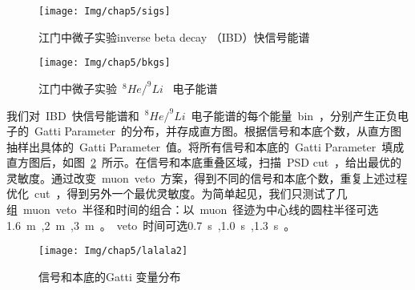 \begin{figure}[!htb]
\begin{minipage}[t]{0.48\linewidth}
    \centering
    \texttt{[image: Img/chap5/sigs]}
    \caption{江门中微子实验inverse beta decay （IBD）快信号能谱}
    \label{fig:p513}
\end{minipage}
\quad\quad
\begin{minipage}[t]{0.48\linewidth}
    \centering
    \texttt{[image: Img/chap5/bkgs]}
    \caption{江门中微子实验~$^{8}He/^{9}Li$~ 电子能谱}
    \label{fig:p514}
\end{minipage}
\end{figure}

我们对~IBD~快信号能谱和~$^{8}He/^{9}Li$~电子能谱的每个能量~bin~，分别产生正负电子的~Gatti Parameter~的分布，并存成直方图。根据信号和本底个数，从直方图抽样出具体的~Gatti Parameter~值。将所有信号和本底的~Gatti Parameter~填成直方图后，如图~\ref{fig:p519}~所示。在信号和本底重叠区域，扫描~PSD cut~，给出最优的灵敏度。通过改变~muon~veto~方案，得到不同的信号和本底个数，重复上述过程优化~cut~，得到另外一个最优灵敏度。为简单起见，我们只测试了几组~muon~veto~半径和时间的组合：以~muon~径迹为中心线的圆柱半径可选1.6~m~,2~m~,3~m~。~veto~时间可选0.7~s~,1.0~s~,1.3~s~。
\begin{figure}[!htbp]
  \centering
   \texttt{[image: Img/chap5/lalala2]}
    \caption{信号和本底的Gatti 变量分布}
  \label{fig:p519}
\end{figure}
